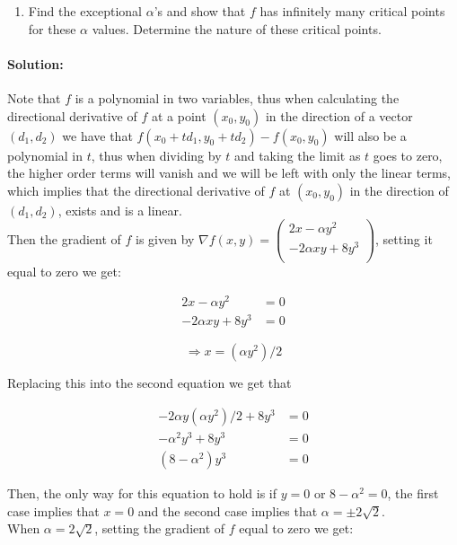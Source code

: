 \documentclass[10pt]{article}
\begin{document}
\begin{enumerate}[label=(\alph*)]
    \item Find the exceptional $\alpha$'s and show that $f$ has infinitely many critical points for these $\alpha$ values. Determine the nature of these critical points.
\end{enumerate}

\paragraph{Solution:}

Note that $f$ is a polynomial in two variables, thus when calculating the directional derivative of $f$ at 
a point $(x_0,y_0)$ in the direction of a vector $(d_1,d_2)$ we have that
$f(x_0 + td_1, y_0 + td_2) - f(x_0,y_0)$ will also be a polynomial in $t$, 
thus when dividing by $t$ and taking the limit as $t$ goes to zero, the higher 
order terms will vanish and we will be left with only the linear terms, which implies 
that the directional derivative of $f$ at $(x_0,y_0)$ in the direction of $(d_1,d_2)$, exists and is a linear.\\

Then the gradient of $f$ is given by $\nabla f(x,y) = \begin{pmatrix}
2x - \alpha y^2 \\
-2\alpha xy + 8y^3\\
\end{pmatrix}$, setting it equal to zero we get:

\begin{align}
    2x - \alpha y^2 &= 0\\
    -2\alpha xy + 8y^3 &= 0
\end{align}

$$\Rightarrow x = (\alpha y^2)/2$$

Replacing this into the second equation we get that 

\begin{align*}
    -2\alpha y(\alpha y^2)/2 + 8y^3 &= 0\\
    -\alpha^2 y^3 + 8y^3 &= 0\\
    (8-\alpha^2)y^3 &= 0
\end{align*}

Then, the only way for this equation to hold is if $y=0$ or $8-\alpha^2=0$, the first case implies that $x=0$ and the second case implies that $\alpha = \pm 2\sqrt{2}$.\\

When $\alpha = 2\sqrt{2}$, setting the gradient of $f$ equal to zero we get:
\end{document}
